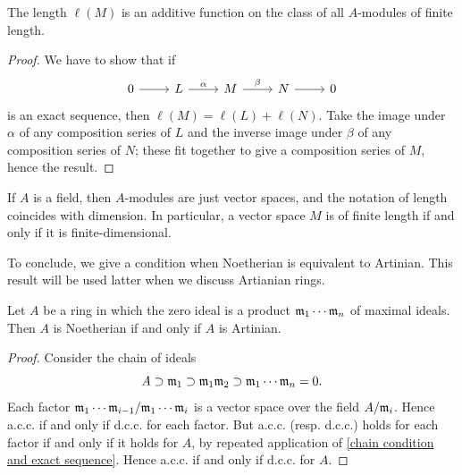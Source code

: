\begin{proposition}\label{module length add}
The length $\ell(M)$ is an additive function on the class of all $A$-modules of finite length.
\end{proposition}
\begin{proof}
We have to show that if
\[\begin{tikzcd}
0\ar[r]&L\ar[r,"\alpha"]&M\ar[r,"\beta"]&N\ar[r]&0
\end{tikzcd}\] 
is an exact sequence, then $\ell(M)=\ell(L)+\ell(N)$. Take the image under $\alpha$ of any composition series of $L$ and the inverse image under $\beta$ of any composition series of $N$; these fit together to give a composition series of $M$, hence the result.
\end{proof}
\begin{example}
If $A$ is a field, then $A$-modules are just vector spaces, and the notation of length coincides with dimension. In particular, a vector space $M$ is of finite length if and only if it is finite-dimensional.
\end{example}
To conclude, we give a condition when Noetherian is equivalent to Artinian. This result will be used latter when we discuss Artianian rings.
\begin{corollary}\label{Noe iff Art if zero is product of maximal}
Let $A$ be a ring in which the zero ideal is a product $\mathfrak{m}_1\cdots\mathfrak{m}_n$ of maximal ideals. Then $A$ is Noetherian if and only if $A$ is Artinian.
\end{corollary}
\begin{proof}
Consider the chain of ideals 
\[A\supset \mathfrak{m}_1\supset \mathfrak{m}_1\mathfrak{m}_2\supset\mathfrak{m}_1\cdots\mathfrak{m}_n=0.\] 
Each factor $\mathfrak{m}_1\cdots\mathfrak{m}_{i-1}/\mathfrak{m}_1\cdots\mathfrak{m}_i$ is a vector space over the field $A/\mathfrak{m}_i$. Hence a.c.c. if and only if d.c.c. for each factor. But a.c.c. (resp. d.c.c.) holds for each factor if and only if it holds for $A$, by repeated application of \cref{chain condition and exact sequence}. Hence a.c.c. if and only if d.c.c. for $A$.
\end{proof}
